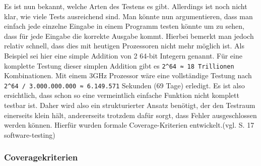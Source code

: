 Es ist nun bekannt, welche Arten des Testens es gibt.
Allerdings ist noch nicht klar, wie viele Tests ausreichend sind.
Man könnte nun argumentieren, dass man einfach jede einzelne Eingabe in einem Programm testen könnte um zu sehen,
dass für jede Eingabe die korrekte Ausgabe kommt.
Hierbei bemerkt man jedoch relativ schnell, dass dies mit heutigen Prozessoren nicht mehr möglich ist.
Als Beispiel sei hier eine simple Addition von 2 64-bit Integern genannt.
Für eine komplette Testung dieser simplen Addition gibt es \verb+2^64 ≈ 18 Trillionen+ Kombinationen.
Mit einem 3GHz Prozessor wäre eine vollständige Testung nach \verb+2^64 / 3.000.000.000 ≈ 6.149.571+ Sekunden (69 Tage) erledigt.
Es ist also ersichtlich, dass schon so eine vermeintlich einfache Funktion nicht komplett testbar ist.
Daher wird also ein strukturierter Ansatz benötigt, der den Testraum einerseits klein hält, andererseits trotzdem dafür sorgt, dass
Fehler ausgeschlossen werden können.
Hierfür wurden formale Coverage-Kriterien entwickelt.(vgl. S. 17 software-testing)




\subsubsection{Coveragekriterien}










